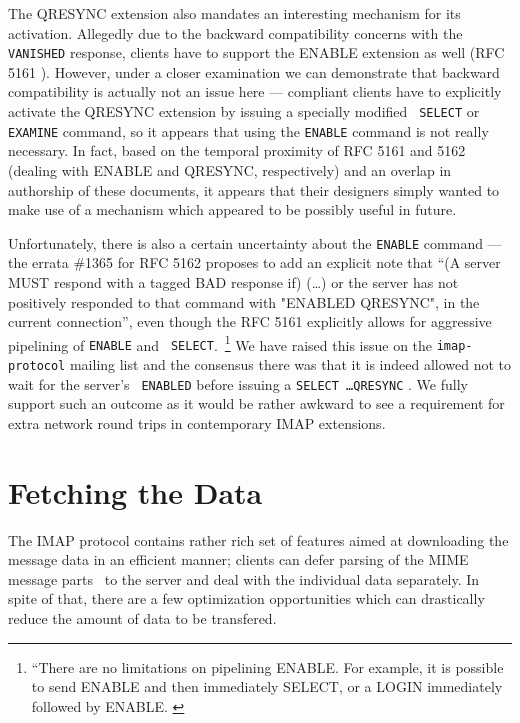 \documentclass[trojita]{subfiles}
\begin{document}
The QRESYNC extension also mandates an interesting mechanism for its activation.  Allegedly due to the backward
compatibility concerns with the {\tt VANISHED} response, clients have to support the ENABLE extension as well (RFC 5161
\cite{rfc5161}).  However, under a closer examination we can demonstrate that backward compatibility is actually not an
issue here --- compliant clients have to explicitly activate the QRESYNC extension by issuing a specially modified {\tt
SELECT} or {\tt EXAMINE} command, so it appears that using the {\tt ENABLE} command is not really necessary.  In fact,
based on the temporal proximity of RFC 5161 and 5162 (dealing with ENABLE and QRESYNC, respectively) and an overlap in
authorship of these documents, it appears that their designers simply wanted to make use of a mechanism which appeared
to be possibly useful in future.

Unfortunately, there is also a certain uncertainty about the {\tt ENABLE} command --- the errata \#1365 for RFC 5162
\cite{rfc5162-errata} proposes to add an explicit note that ``(A server MUST respond with a tagged BAD
response if) (\ldots) or the server has not positively responded to that command with "ENABLED QRESYNC", in the current
connection'', even though the RFC 5161 explicitly allows for aggressive pipelining of {\tt ENABLE} and {\tt
SELECT}.~\footnote{``There are no limitations on pipelining ENABLE.  For example, it is possible to send ENABLE and then
immediately SELECT, or a LOGIN immediately followed by ENABLE. \cite[p. 2]{rfc5161}}  We have raised this issue on the
{\tt imap-protocol} mailing list and the consensus there was that it is indeed allowed not to wait for the server's {\tt
ENABLED} before issuing a {\tt SELECT \ldots QRESYNC} \cite{melnikov-qresync-enable}.  We fully support such an outcome
as it would be rather awkward to see a requirement for extra network round trips in contemporary IMAP extensions.

\section{Fetching the Data}

The IMAP protocol contains rather rich set of features aimed at downloading the message data in an efficient manner;
clients can defer parsing of the MIME message parts~\cite{rfc2045} to the server and deal with the individual data
separately.  In spite of that, there are a few optimization opportunities which can drastically reduce the amount of
data to be transfered.
\end{document}
